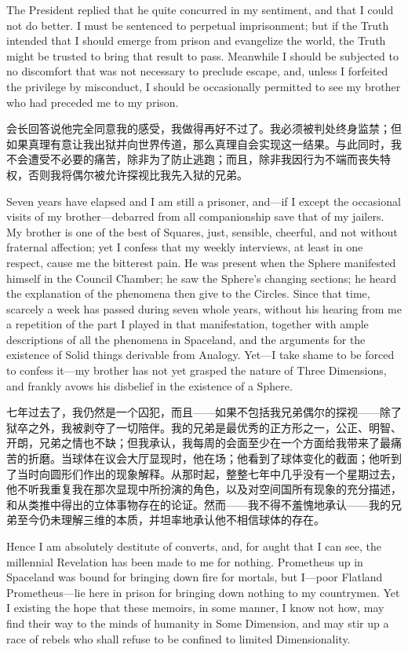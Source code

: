 \documentclass[12pt,UTF8]{ctexbook}
\begin{document}
The President replied that he quite concurred in my sentiment, and that I could not do better. I must be sentenced to perpetual imprisonment; but if the Truth intended that I should emerge from prison and evangelize the world, the Truth might be trusted to bring that result to pass. Meanwhile I should be subjected to no discomfort that was not necessary to preclude escape, and, unless I forfeited the privilege by misconduct, I should be occasionally permitted to see my brother who had preceded me to my prison.

会长回答说他完全同意我的感受，我做得再好不过了。我必须被判处终身监禁；但如果真理有意让我出狱并向世界传道，那么真理自会实现这一结果。与此同时，我不会遭受不必要的痛苦，除非为了防止逃跑；而且，除非我因行为不端而丧失特权，否则我将偶尔被允许探视比我先入狱的兄弟。

Seven years have elapsed and I am still a prisoner, and---if I except the occasional visits of my brother---debarred from all companionship save that of my jailers. My brother is one of the best of Squares, just, sensible, cheerful, and not without fraternal affection; yet I confess that my weekly interviews, at least in one respect, cause me the bitterest pain. He was present when the Sphere manifested himself in the Council Chamber; he saw the Sphere's changing sections; he heard the explanation of the phenomena then give to the Circles. Since that time, scarcely a week has passed during seven whole years, without his hearing from me a repetition of the part I played in that manifestation, together with ample descriptions of all the phenomena in Spaceland, and the arguments for the existence of Solid things derivable from Analogy. Yet---I take shame to be forced to confess it---my brother has not yet grasped the nature of Three Dimensions, and frankly avows his disbelief in the existence of a Sphere.

七年过去了，我仍然是一个囚犯，而且——如果不包括我兄弟偶尔的探视——除了狱卒之外，我被剥夺了一切陪伴。我的兄弟是最优秀的正方形之一，公正、明智、开朗，兄弟之情也不缺；但我承认，我每周的会面至少在一个方面给我带来了最痛苦的折磨。当球体在议会大厅显现时，他在场；他看到了球体变化的截面；他听到了当时向圆形们作出的现象解释。从那时起，整整七年中几乎没有一个星期过去，他不听我重复我在那次显现中所扮演的角色，以及对空间国所有现象的充分描述，和从类推中得出的立体事物存在的论证。然而——我不得不羞愧地承认——我的兄弟至今仍未理解三维的本质，并坦率地承认他不相信球体的存在。

Hence I am absolutely destitute of converts, and, for aught that I can see, the millennial Revelation has been made to me for nothing. Prometheus up in Spaceland was bound for bringing down fire for mortals, but I---poor Flatland Prometheus---lie here in prison for bringing down nothing to my countrymen. Yet I existing the hope that these memoirs, in some manner, I know not how, may find their way to the minds of humanity in Some Dimension, and may stir up a race of rebels who shall refuse to be confined to limited Dimensionality.
\end{document}
